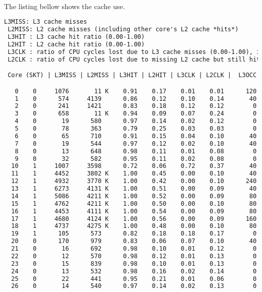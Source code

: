 \noindent
\\
The listing bellow shows the cache use.
\begin{lstlisting}[language=TeX]
 L3MISS: L3 cache misses 
 L2MISS: L2 cache misses (including other core's L2 cache *hits*) 
 L3HIT : L3 cache hit ratio (0.00-1.00)
 L2HIT : L2 cache hit ratio (0.00-1.00)
 L3CLK : ratio of CPU cycles lost due to L3 cache misses (0.00-1.00), in some cases could be >1.0 due to a higher memory latency
 L2CLK : ratio of CPU cycles lost due to missing L2 cache but still hitting L3 cache (0.00-1.00)

 Core (SKT) | L3MISS | L2MISS | L3HIT | L2HIT | L3CLK | L2CLK |  L3OCC

   0    0     1076       11 K    0.91    0.17    0.01    0.01      120
   1    0      574     4139      0.86    0.12    0.10    0.14       40
   2    0      241     1421      0.83    0.18    0.12    0.12        0
   3    0      658       11 K    0.94    0.09    0.07    0.24        0
   4    0       19      580      0.97    0.14    0.02    0.12        0
   5    0       78      363      0.79    0.25    0.03    0.03        0
   6    0       65      710      0.91    0.15    0.04    0.10       40
   7    0       19      544      0.97    0.12    0.02    0.10       40
   8    0       13      648      0.98    0.11    0.01    0.08        0
   9    0       32      582      0.95    0.11    0.02    0.08        0
  10    1     1007     3598      0.72    0.06    0.72    0.37       40
  11    1     4452     3802 K    1.00    0.45    0.00    0.10       40
  12    1     4932     3770 K    1.00    0.42    0.00    0.10      240
  13    1     6273     4131 K    1.00    0.51    0.00    0.09       40
  14    1     5086     4211 K    1.00    0.52    0.00    0.09       80
  15    1     4762     4211 K    1.00    0.50    0.00    0.10       80
  16    1     4453     4111 K    1.00    0.54    0.00    0.09       80
  17    1     4680     4124 K    1.00    0.56    0.00    0.09      160
  18    1     4737     4275 K    1.00    0.48    0.00    0.10       80
  19    1      105      573      0.82    0.18    0.18    0.17        0
  20    0      170      979      0.83    0.06    0.07    0.10       40
  21    0       16      692      0.98    0.10    0.01    0.12        0
  22    0       12      570      0.98    0.12    0.01    0.13        0
  23    0       15      839      0.98    0.10    0.01    0.13        0
  24    0       13      532      0.98    0.16    0.02    0.14        0
  25    0       22      441      0.95    0.21    0.01    0.06        0
  26    0       14      540      0.97    0.14    0.02    0.13        0

\end{lstlisting}
